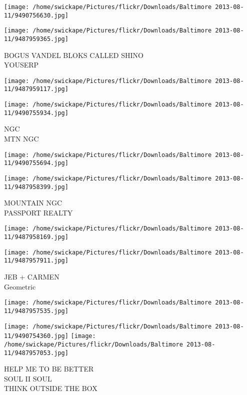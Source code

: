 \documentclass[10pt,letterpaper]{article}
\begin{document}
\texttt{[image: /home/swickape/Pictures/flickr/Downloads/Baltimore 2013-08-11/9490756630.jpg]}

\vspace{0.25in}
\texttt{[image: /home/swickape/Pictures/flickr/Downloads/Baltimore 2013-08-11/9487959365.jpg]}

BOGUS VANDEL BLOKS CALLED SHINO\\
YOUSERP
\pagebreak

\texttt{[image: /home/swickape/Pictures/flickr/Downloads/Baltimore 2013-08-11/9487959117.jpg]}

\vspace{0.25in}
\texttt{[image: /home/swickape/Pictures/flickr/Downloads/Baltimore 2013-08-11/9490755934.jpg]}

NGC\\
MTN NGC
\pagebreak

\texttt{[image: /home/swickape/Pictures/flickr/Downloads/Baltimore 2013-08-11/9490755694.jpg]}

\vspace{0.25in}
\texttt{[image: /home/swickape/Pictures/flickr/Downloads/Baltimore 2013-08-11/9487958399.jpg]}

MOUNTAIN NGC\\
PASSPORT REALTY
\pagebreak

\texttt{[image: /home/swickape/Pictures/flickr/Downloads/Baltimore 2013-08-11/9487958169.jpg]}

\vspace{0.25in}
\texttt{[image: /home/swickape/Pictures/flickr/Downloads/Baltimore 2013-08-11/9487957911.jpg]}

JEB + CARMEN\\
Geometric
\pagebreak

\texttt{[image: /home/swickape/Pictures/flickr/Downloads/Baltimore 2013-08-11/9487957535.jpg]}

\vspace{0.25in}
\texttt{[image: /home/swickape/Pictures/flickr/Downloads/Baltimore 2013-08-11/9490754360.jpg]}
\texttt{[image: /home/swickape/Pictures/flickr/Downloads/Baltimore 2013-08-11/9487957053.jpg]}

HELP ME TO BE BETTER\\
SOUL II SOUL\\
THINK OUTSIDE THE BOX
\pagebreak
\end{document}
